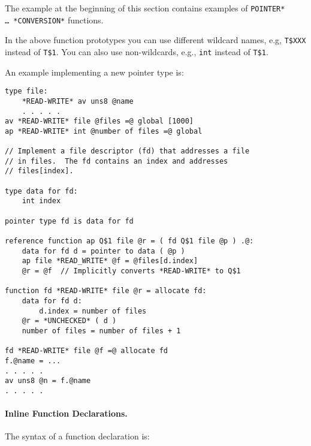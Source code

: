\documentclass[12pt]{article}
\newcommand{\subsubsubsection}[1]{\paragraph[#1]{#1.}}
\newenvironment{indpar}[1][0.3in]%
	{\begin{list}{}%
		     {\setlength{\itemsep}{0in}%
		      \setlength{\topsep}{0in}%
		      \setlength{\parsep}{1ex}%
		      \setlength{\labelwidth}{#1}%
		      \setlength{\leftmargin}{#1}%
		      \addtolength{\leftmargin}{\labelsep}}%
	 \item}%
	{\end{list}}
\begin{document}
The example at the beginning of this section contains
examples of {\tt *POINTER* \ldots{}~*CON\-VER\-SION*} functions.

In the above function prototypes you can use different wildcard names,
e.g, {\tt T\$XXX} instead of {\tt T\$1}.  You can also
use non-wildcards, e.g., {\tt int} instead of {\tt T\$1}.

An example implementing a new pointer type is:

\begin{indpar}\begin{verbatim}
type file:
    *READ-WRITE* av uns8 @name
    . . . . .
av *READ-WRITE* file @files =@ global [1000]
ap *READ-WRITE* int @number of files =@ global

// Implement a file descriptor (fd) that addresses a file
// in files.  The fd contains an index and addresses
// files[index].

type data for fd:
    int index

pointer type fd is data for fd

reference function ap Q$1 file @r = ( fd Q$1 file @p ) .@:
    data for fd d = pointer to data ( @p )
    ap file *READ_WRITE* @f = @files[d.index]
    @r = @f  // Implicitly converts *READ-WRITE* to Q$1

function fd *READ-WRITE* file @r = allocate fd:
    data for fd d:
        d.index = number of files
    @r = *UNCHECKED* ( d )
    number of files = number of files + 1

fd *READ-WRITE* file @f =@ allocate fd
f.@name = ...
. . . . .
av uns8 @n = f.@name
. . . . .
\end{verbatim}\end{indpar}

\subsubsubsection{Inline Function Declarations}
\label{INLINE-FUNCTION-DECLARATIONS}

The syntax of a function declaration is:
\end{document}
